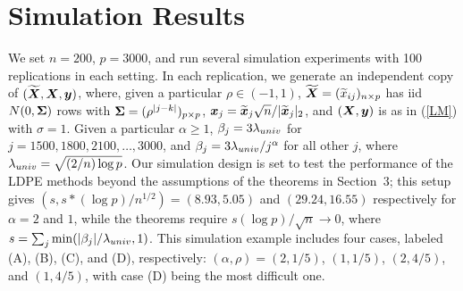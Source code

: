 \documentclass[11pt]{amsart}
\begin{document}

\section{Simulation Results}
We set $n=200$, $p=3000$, and run several simulation experiments with 
100 replications in each setting. 
In each replication, we generate an independent copy of $({\widetilde{\boldsymbol{X}}},\boldsymbol{X},\boldsymbol{y})$, 
where, given a particular $\rho \in(-1,1)$, ${\widetilde{\boldsymbol{X}}} = (\widetilde{x}_{ij})_{n\times p}$ 
has iid $N(0,\boldsymbol{\Sigma})$ rows with $\boldsymbol{\Sigma} = (\rho^{|j-k|})_{p\times p}$, 
$\boldsymbol{x}_j = {\widetilde{\boldsymbol{x}}}_j\sqrt{n}/{|}{\widetilde{\boldsymbol{x}}}_j{|}_2$, and $(\boldsymbol{X},\boldsymbol{y})$ is as in (\ref{LM}) with $\sigma=1$. 
Given a particular $\alpha \geq 1$, $\beta_j = 3\lambda_{univ}$ for $j = 1500, 1800, 2100, \ldots, 3000$, 
and $\beta_j = 3\lambda_{univ}/j^\alpha$ for all other $j$, where $\lambda_{univ}=\sqrt{(2/n)\log p}$. 
Our simulation design is set to test the performance of the LDPE methods 
beyond the assumptions of the theorems in Section~3;
this setup gives 
$(s,s*(\log p)/n^{1/2})=(8.93,5.05)$ and $(29.24,16.55)$ respectively for 
$\alpha=2$ and $1$, while the theorems require $s(\log p)/\sqrt{n}\to 0$, 
where $s=\sum_j\min(|\beta_j|/\lambda_{univ},1)$. 
This simulation example includes four cases, labeled (A), (B), (C), and (D), respectively:
$(\alpha,\rho)=(2,1/5)$, $(1,1/5)$, $(2,4/5)$, and $(1,4/5)$, with case (D) being the most difficult one. 
\end{document}
